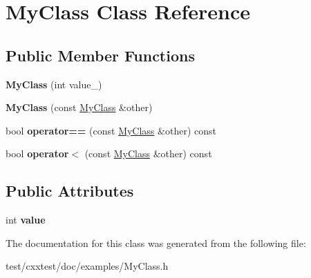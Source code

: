 \hypertarget{classMyClass}{\section{My\-Class Class Reference}
\label{classMyClass}
}
\subsection*{Public Member Functions}
\begin{DoxyCompactItemize}
\item 
\hypertarget{classMyClass_a8e45b25c74543e0f2b99830639d773a2}{{\bfseries My\-Class} (int value\-\_\-)}\label{classMyClass_a8e45b25c74543e0f2b99830639d773a2}

\item 
\hypertarget{classMyClass_afc23f6132f9f7178a799bdc95fd428a1}{{\bfseries My\-Class} (const \hyperlink{classMyClass}{My\-Class} \&other)}\label{classMyClass_afc23f6132f9f7178a799bdc95fd428a1}

\item 
\hypertarget{classMyClass_a27b2fae025b898b9f43562b5e25a2a9c}{bool {\bfseries operator==} (const \hyperlink{classMyClass}{My\-Class} \&other) const }\label{classMyClass_a27b2fae025b898b9f43562b5e25a2a9c}

\item 
\hypertarget{classMyClass_a63ef472a4306b399676ea3e774b4f2e9}{bool {\bfseries operator$<$} (const \hyperlink{classMyClass}{My\-Class} \&other) const }\label{classMyClass_a63ef472a4306b399676ea3e774b4f2e9}

\end{DoxyCompactItemize}
\subsection*{Public Attributes}
\begin{DoxyCompactItemize}
\item 
\hypertarget{classMyClass_ad864cbb8e43ddfba39fede346e337ad3}{int {\bfseries value}}\label{classMyClass_ad864cbb8e43ddfba39fede346e337ad3}

\end{DoxyCompactItemize}


The documentation for this class was generated from the following file\-:\begin{DoxyCompactItemize}
\item 
test/cxxtest/doc/examples/My\-Class.\-h\end{DoxyCompactItemize}

